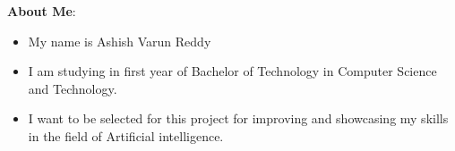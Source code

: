 \documentclass{article}
\begin{document}
\begin{flushleft}
\textbf{About Me}: \\[0.35cm]
\renewcommand{\labelitemi}{-}
\begin{itemize}
 \item My name is Ashish Varun Reddy \\
 \item I am studying in first year of Bachelor of Technology in Computer Science and Technology. \\
 \item I want to be selected for this project for improving and showcasing my skills in the field of Artificial intelligence.
\end{itemize}


\end{flushleft}
\end{document}
